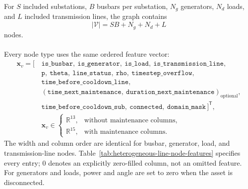 For $S$ included substations, $B$ busbars per substation, $N_g$ generators,
$N_d$ loads, and $L$ included transmission lines, the graph contains
\begin{equation}
  |\mathcal{V}| = SB + N_g + N_d + L
  \label{eq:heterogeneous-line-node-count}
\end{equation}
nodes.
\\
\\
Every node type uses the same ordered feature vector:
\begin{equation}
  \begin{split}
  \mathbf{x}_v = [\,&
  \texttt{is\_busbar},\
  \texttt{is\_generator},\
  \texttt{is\_load},\
  \texttt{is\_transmission\_line},\\
  &\texttt{p},\
  \texttt{theta},\
  \texttt{line\_status},\
  \texttt{rho},\
  \texttt{timestep\_overflow},\\
  &\texttt{time\_before\_cooldown\_line},\\
  &(\texttt{time\_next\_maintenance},\
  \texttt{duration\_next\_maintenance})_{\mathrm{optional}},\\
  &\texttt{time\_before\_cooldown\_sub},\
  \texttt{connected},\
  \texttt{domain\_mask}
  \,]^{\mathsf T},\\
  &\mathbf{x}_v \in
  \begin{cases}
    \mathbb{R}^{13}, & \text{without maintenance columns},\\
    \mathbb{R}^{15}, & \text{with maintenance columns}.
  \end{cases}
  \end{split}
  \label{eq:heterogeneous-line-common-node-vector}
\end{equation}
The width and column order are identical for busbar, generator, load, and
transmission-line nodes. Table~\ref{tab:heterogeneous-line-node-features}
specifies every entry; \(0\) denotes an explicitly zero-filled column, not an
omitted feature. For generators and loads, power and angle are set to zero when
the asset is disconnected.

